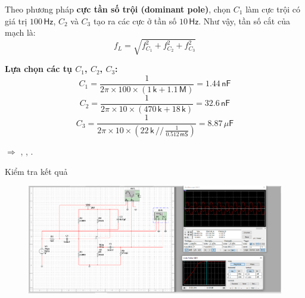 Theo phương pháp \textbf{cực tần số trội (dominant pole)}, chọn $C_{1}$ làm cực trội có giá trị $100\,\textsf{Hz}$, 
$C_{2}$ và $C_{3}$ tạo ra các cực ở tần số $10\,\textsf{Hz}$.  
Như vậy, tần số cắt của mạch là:
\[
f_{L}=\sqrt{f_{C_{1}}^{2}+f_{C_{2}}^{2}+f_{C_{3}}^{2}}
\]

\textbf{Lựa chọn các tụ $C_{1}$, $C_{2}$, $C_{3}$:}
\[
C_{1}=\frac{1}{2\pi\times100\times\left(1\,\textsf{k}+1.1\,\textsf{M}\right)}=1.44\,\textsf{nF}
\]
\[
C_{2}=\frac{1}{2\pi\times10\times(470\,\textsf{k}+18\,\textsf{k})}=32.6\,\textsf{nF}
\]
\[
C_{3}=\frac{1}{2\pi\times10\times\left(22\,\textsf{k}\,//\,\frac{1}{0.512\,\textsf{mS}}\right)}=8.87\,\mu\textsf{F}
\]

$\Rightarrow$ , , .

Kiểm tra kết quả

\begin{figure}[H]
	\centering
	\includegraphics[width=\linewidth]{./my-chapters/my-images/Question1/Câu 1 Hình 2 d.png}
\end{figure}
